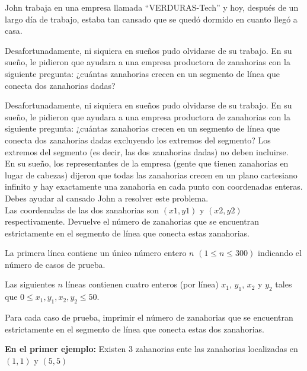 
John trabaja en una empresa llamada ``VERDURAS-Tech'' y hoy, después de un largo día de trabajo, estaba tan cansado que se quedó dormido en cuanto llegó a casa.

Desafortunadamente, ni siquiera en sueños pudo olvidarse de su trabajo. 
En su sueño, le pidieron que ayudara a una empresa productora de zanahorias con la siguiente pregunta: 
¿cuántas zanahorias crecen en un segmento de línea que conecta dos zanahorias dadas?

Desafortunadamente, ni siquiera en sueños pudo olvidarse de su trabajo.
En su sueño, le pidieron que ayudara a una empresa productora de zanahorias con la siguiente pregunta: 
¿cuántas zanahorias crecen en un segmento de línea que conecta dos zanahorias dadas excluyendo los extremos del segmento? 
Los extremos del segmento (es decir, las dos zanahorias dadas) no deben incluirse.\\

En su sueño, los representantes de la empresa (gente que tienen zanahorias en lugar de cabezas) dijeron que todas las zanahorias crecen en un plano cartesiano infinito y hay exactamente una zanahoria en cada punto con coordenadas enteras. Debes ayudar al cansado John a resolver este problema.\\

Las coordenadas de las dos zanahorias son $(x1, y1)$ y $(x2, y2)$ respectivamente. Devuelve el número de zanahorias que se encuentran estrictamente en el segmento de línea que conecta estas zanahorias.


La primera línea contiene un único número entero $n$ $(1 \le n \le 300)$ indicando el número de casos de prueba.

Las siguientes $n$ líneas contienen cuatro enteros (por línea) $x_1$, $y_1$, $x_2$ y $y_2$ tales que $0 \leq x_1, y_1, x_2, y_2 \leq 50$.

\outputText

Para cada caso de prueba, imprimir el número de zanahorias que se encuentran estrictamente en el segmento de línea que conecta estas dos zanahorias.

\exampleCases

\begin{example}
\end{example}

\explanationText

\textbf{En el primer ejemplo:} Existen $3$ zahanorias ente las zanahorias localizadas en $(1,1)$ y $(5, 5)$

\begin{figure}[h]
    \centering
    
\end{figure}